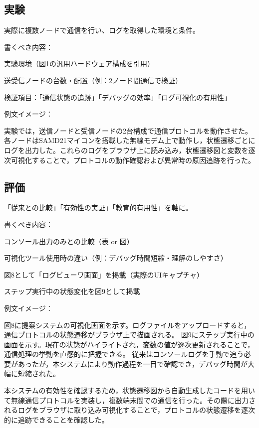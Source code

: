 \documentclass[technicalreport]{ieicej}
\begin{document}
\subsection{実験}
実際に複数ノードで通信を行い、ログを取得した環境と条件。

書くべき内容：

実験環境（図1の汎用ハードウェア構成を引用）

送受信ノードの台数・配置（例：2ノード間通信で検証）

検証項目：「通信状態の追跡」「デバッグの効率」「ログ可視化の有用性」

例文イメージ：

実験では，送信ノードと受信ノードの2台構成で通信プロトコルを動作させた。各ノードはSAMD21マイコンを搭載した無線モデム上で動作し，状態遷移ごとにログを出力した。これらのログをブラウザ上に読み込み，状態遷移図と変数を逐次可視化することで，プロトコルの動作確認および異常時の原因追跡を行った。

\subsection{評価}
「従来との比較」「有効性の実証」「教育的有用性」を軸に。

書くべき内容：

コンソール出力のみとの比較（表 or 図）

可視化ツール使用時の違い（例：デバッグ時間短縮・理解のしやすさ）

図8として「ログビューワ画面」を掲載（実際のUIキャプチャ）

ステップ実行中の状態変化を図9として掲載

例文イメージ：

図8に提案システムの可視化画面を示す。ログファイルをアップロードすると，通信プロトコルの状態遷移がブラウザ上で描画される。
図9にステップ実行中の画面を示す。現在の状態がハイライトされ，変数の値が逐次更新されることで，通信処理の挙動を直感的に把握できる。
従来はコンソールログを手動で追う必要があったが，本システムにより動作過程を一目で確認でき，デバッグ時間が大幅に短縮された。


本システムの有効性を確認するため，状態遷移図から自動生成したコードを用いて無線通信プロトコルを実装し，複数端末間での通信を行った。その際に出力されるログをブラウザに取り込み可視化することで，プロトコルの状態遷移を逐次的に追跡できることを確認した。
\end{document}
